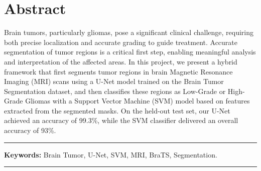 \chapter*{\hfill Abstract \hfill}

Brain tumors, particularly gliomas, pose a significant clinical challenge, requiring both precise localization and accurate grading to guide treatment. Accurate segmentation of tumor regions is a critical first step, enabling meaningful analysis and interpretation of the affected areas. In this project, we present a hybrid framework that first segments tumor regions in brain Magnetic Resonance Imaging (MRI) scans using a U-Net model trained on the Brain Tumor Segmentation dataset, and then classifies these regions as Low-Grade or High-Grade Gliomas with a Support Vector Machine (SVM) model based on features extracted from the segmented masks. On the held-out test set, our U-Net achieved an accuracy of 99.3\%, while the SVM classifier delivered an overall accuracy of 93\%.


\noindent\rule{\textwidth}{0.2pt}
\textbf{Keywords:} Brain Tumor, U-Net, SVM, MRI, BraTS, Segmentation.\\
\noindent\rule{\textwidth}{0.2pt}
